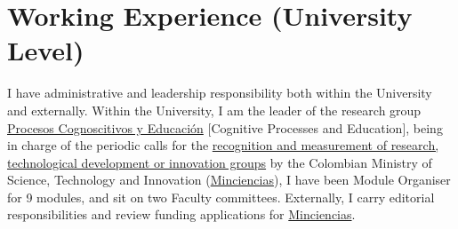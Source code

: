 \documentclass[11pt, a4paper]{awesome-cv}
\begin{document}
\hypertarget{working-experience-university-level}{%
\section{Working Experience (University
Level)}\label{working-experience-university-level}}

I have administrative and leadership responsibility both within the
University and externally. Within the University, I am the leader of the
research group
\href{https://investigaciones.unbosque.edu.co/procesos-cognoscitivos-y-educacion}{Procesos
Cognoscitivos y Educación} {[}Cognitive Processes and Education{]},
being in charge of the periodic calls for the
\href{https://minciencias.gov.co/convocatorias/fortalecimiento-capacidades-para-la-generacion-conocimiento/convocatoria-nacional-para}{recognition
and measurement of research, technological development or innovation
groups} by the Colombian Ministry of Science, Technology and Innovation
(\href{https://minciencias.gov.co/}{Minciencias}), I have been Module
Organiser for 9 modules, and sit on two Faculty committees. Externally,
I carry editorial responsibilities and review funding applications for
\href{https://minciencias.gov.co/}{Minciencias}.
\end{document}
